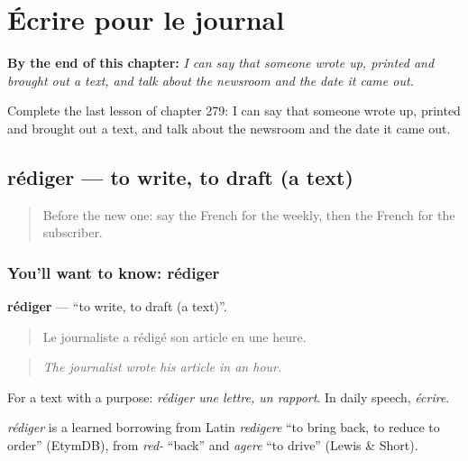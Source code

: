 
\chapter{Écrire pour le journal}
\label{ch:fr-ecrire-pour-le-journal}

\begin{chapteropening}
\textbf{By the end of this chapter:} \emph{I can say that someone wrote up, printed and brought out a text, and talk about the newsroom and the date it came out.}

Complete the last lesson of chapter 279: I can say that someone wrote up, printed and brought out a text, and talk about the newsroom and the date it came out.
\end{chapteropening}

\section[rédiger]{rédiger — to write, to draft (a text)}

\label{lesson:FR-C279-rediger}



\begin{quote}
Before the new one: say the French for the weekly, then the French for the subscriber.
\end{quote}

\subsection*{You'll want to know: rédiger}
\textbf{rédiger} — \textquotedblleft{}to write, to draft (a text)\textquotedblright{}.

\begin{quote}
Le journaliste a rédigé son article en une heure.
\end{quote}

\begin{quote}
\emph{The journalist wrote his article in an hour.}
\end{quote}

For a text with a purpose: \emph{rédiger une lettre, un rapport}. In daily speech, \emph{écrire}.

\begin{cousinweb}
\emph{rédiger} is a learned borrowing from Latin \emph{redigere} \textquotedblleft{}to bring back, to reduce to order\textquotedblright{} (EtymDB), from \emph{red-} \textquotedblleft{}back\textquotedblright{} and \emph{agere} \textquotedblleft{}to drive\textquotedblright{} (Lewis \& Short).
\end{cousinweb}

